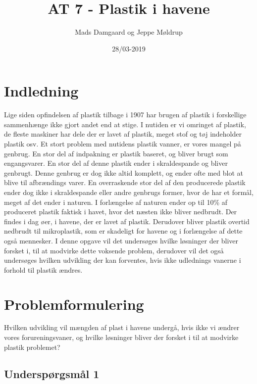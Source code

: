 \documentclass[12pt]{article}
\title{AT 7 - Plastik i havene}
\author{Mads Damgaard og Jeppe Møldrup}
\date{28/03-2019}
\begin{document}
\begin{titlepage}
        \maketitle{}
        \thispagestyle{empty}
        \clearpage{}
\end{titlepage}

\section*{Indledning}

Lige siden opfindelsen af plastik tilbage i 1907 har brugen af plastik i forskellige sammenhænge ikke gjort andet end at stige. I nutiden er vi omringet af plastik, de fleste maskiner har dele der er lavet af plastik, meget stof og tøj indeholder plastik osv. Et stort problem med nutidens plastik vanner, er vores mangel på genbrug. En stor del af indpakning er plastik baseret, og bliver brugt som engangsvarer. En stor del af denne plastik ender i skraldespande og bliver genbrugt. Denne genbrug er dog ikke altid komplett, og ender ofte med blot at blive til afbrændings varer. En overraskende stor del af den producerede plastik ender dog ikke i skraldespande eller andre genbrugs former, hvor de har et formål, meget af det ender i naturen. I forlængelse af naturen ender op til 10\% af produceret plastik faktisk i havet, hvor det næsten ikke bliver nedbrudt. Der findes i dag øer, i havene, der er lavet af plastik. Derudover bliver plastik overtid nedbrudt til mikroplastik, som er skadeligt for havene og i forlængelse af dette også mennesker. I denne opgave vil det undersøges hvilke løsninger der bliver forsket i, til at modvirke dette voksende problem, derudover vil det også undersøges hvilken udvikling der kan forventes, hvis ikke udlednings vanerne i forhold til plastik ændres.

\section*{Problemformulering}

Hvilken udvikling vil mængden af plast i havene undergå, hvis ikke vi ændrer vores forureningsvaner, og hvilke løsninger bliver der forsket i til at modvirke plastik problemet?

\subsection*{Underspørgsmål 1}
\end{document}

